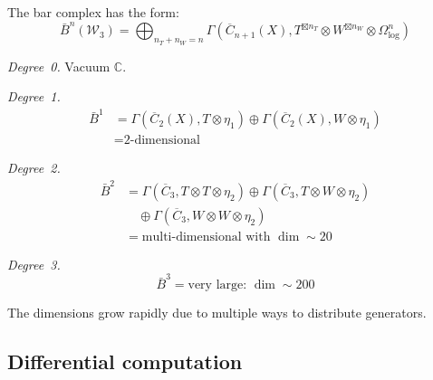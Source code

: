 \begin{construction}\label{const:w3-bar}
The bar complex has the form:
\begin{equation}
\bar{B}^n(\mathcal{W}_3) = \bigoplus_{n_T + n_W = n} \Gamma(\overline{C}_{n+1}(X), T^{\boxtimes n_T} \otimes W^{\boxtimes n_W} \otimes \Omega^n_{\log})
\end{equation}

\emph{Degree~0.} Vacuum $\mathbb{C}$.

\emph{Degree~1.}
\begin{align}
\bar{B}^1 &= \Gamma(\overline{C}_2(X), T \otimes \eta_1) \oplus \Gamma(\overline{C}_2(X), W \otimes \eta_1) \\
&= \text{2-dimensional}
\end{align}

\emph{Degree~2.}
\begin{align}
\bar{B}^2 &= \Gamma(\overline{C}_3, T \otimes T \otimes \eta_2) \oplus \Gamma(\overline{C}_3, T \otimes W \otimes \eta_2) \\
&\quad \oplus \Gamma(\overline{C}_3, W \otimes W \otimes \eta_2) \\
&= \text{multi-dimensional with } \dim \sim 20
\end{align}

\emph{Degree~3.}
\begin{equation}
\bar{B}^3 = \text{very large: } \dim \sim 200
\end{equation}

The dimensions grow rapidly due to multiple ways to distribute generators.
\end{construction}

\subsection{Differential computation}

